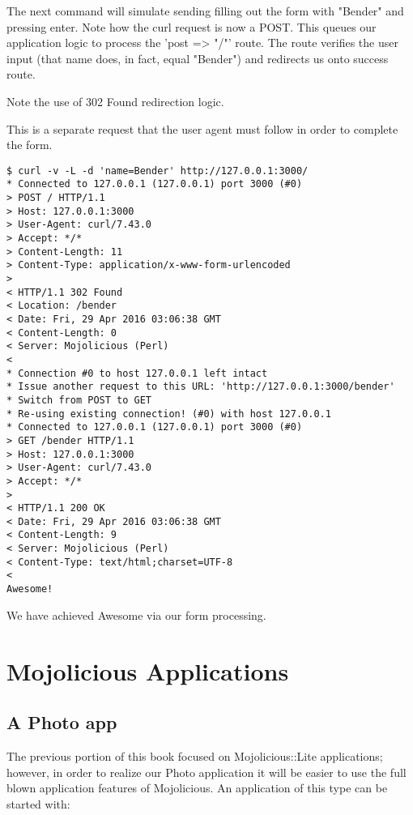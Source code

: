 \documentclass[14pt]{extreport}
\begin{document}
The next command will simulate sending filling out the form with "Bender" and
pressing enter.  Note how the curl request is now a POST.  This queues our
application logic to process the 'post => "/"' route.  The route verifies the
user input (that name does, in fact, equal "Bender") and redirects us onto
success route.

Note the use of 302 Found redirection logic.

This is a separate request that the user agent must follow in order to complete
the form.

\begin{lstlisting}[style=BashOutputStyle]
$ curl -v -L -d 'name=Bender' http://127.0.0.1:3000/
* Connected to 127.0.0.1 (127.0.0.1) port 3000 (#0)
> POST / HTTP/1.1
> Host: 127.0.0.1:3000
> User-Agent: curl/7.43.0
> Accept: */*
> Content-Length: 11
> Content-Type: application/x-www-form-urlencoded
> 
< HTTP/1.1 302 Found
< Location: /bender
< Date: Fri, 29 Apr 2016 03:06:38 GMT
< Content-Length: 0
< Server: Mojolicious (Perl)
< 
* Connection #0 to host 127.0.0.1 left intact
* Issue another request to this URL: 'http://127.0.0.1:3000/bender'
* Switch from POST to GET
* Re-using existing connection! (#0) with host 127.0.0.1
* Connected to 127.0.0.1 (127.0.0.1) port 3000 (#0)
> GET /bender HTTP/1.1
> Host: 127.0.0.1:3000
> User-Agent: curl/7.43.0
> Accept: */*
> 
< HTTP/1.1 200 OK
< Date: Fri, 29 Apr 2016 03:06:38 GMT
< Content-Length: 9
< Server: Mojolicious (Perl)
< Content-Type: text/html;charset=UTF-8
< 
Awesome!
\end{lstlisting}

We have achieved Awesome via our form processing.

\chapter*{Mojolicious Applications}

\section{A Photo app}

The previous portion of this book focused on Mojolicious::Lite applications;
however, in order to realize our Photo application it will be easier to use the
full blown application features of Mojolicious.  An application of this type
can be started with:
\end{document}
